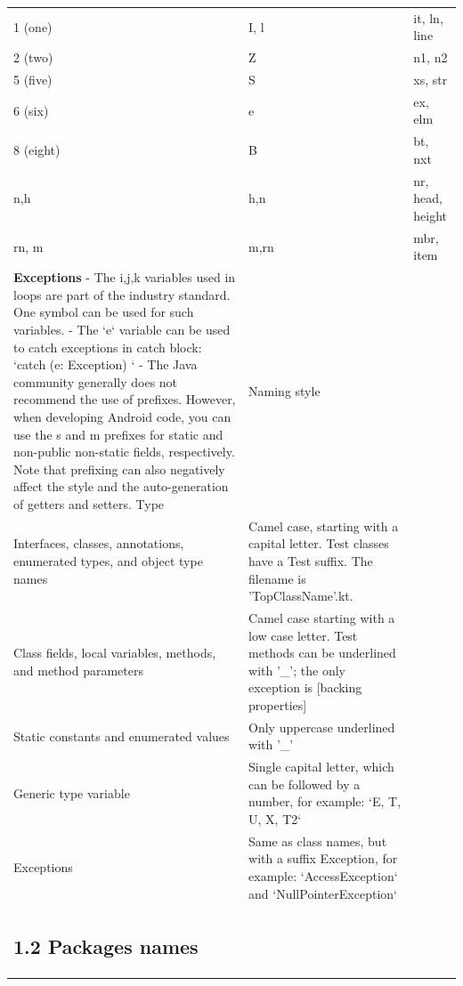 \begin{center}
\begin{tabular}{ |p{}|p{}|p{}| }
 1 (one)       & I, l                     & it, ln, line     \\
 2 (two)       & Z                        & n1, n2           \\
 5 (five)      & S                        & xs, str          \\
 6 (six)       & e                        & ex, elm          \\
 8 (eight)     & B                        & bt, nxt          \\
 n,h           & h,n                      & nr, head, height \\
 rn, m         & m,rn                     & mbr, item        \\
\textbf{Exceptions}
- The i,j,k variables used in loops are part of the industry standard. One symbol can be used for such variables.
- The `e` variable can be used to catch exceptions in catch block: `catch (e: Exception) {}`
- The Java community generally does not recommend the use of prefixes. However, when developing Android code, you can use the s and m prefixes for static and non-public non-static fields, respectively.
Note that prefixing can also negatively affect the style and the auto-generation of getters and setters.
Type&Naming style\\
 Interfaces, classes, annotations, enumerated types, and object type names & Camel case, starting with a capital letter. Test classes have a Test suffix. The filename is 'TopClassName'.kt.  \\
 Class fields, local variables, methods, and method parameters & Camel case starting with a low case letter. Test methods can be underlined with '\_'; the only exception is [backing properties]\\
 Static constants and enumerated values & Only uppercase underlined with '\_' \\
 Generic type variable & Single capital letter, which can be followed by a number, for example: `E, T, U, X, T2` \\
 Exceptions & Same as class names, but with a suffix Exception, for example: `AccessException` and `NullPointerException`\\
\subsection*{\textbf{1.2 Packages names}}

\end{tabular}
\end{center}
